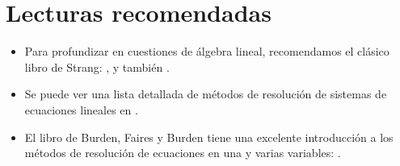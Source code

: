 \section{Lecturas recomendadas}

\begin{itemize}
 \item Para profundizar en cuestiones de álgebra lineal, recomendamos el clásico libro de Strang: , y también .
 \item Se puede ver una lista detallada de métodos de resolución de sistemas de ecuaciones lineales en .
 \item El libro de Burden, Faires y Burden tiene una excelente introducción a los métodos de resolución de ecuaciones en una y varias variables: .
\end{itemize}

